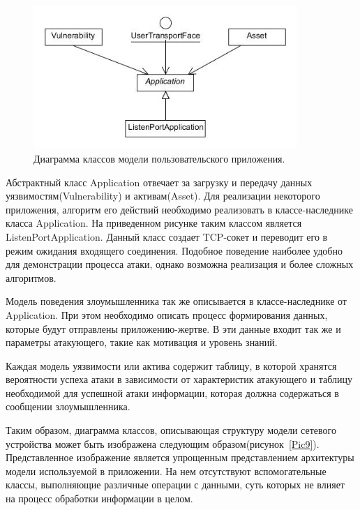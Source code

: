 \documentclass[12pt]{report}
\begin{document}
    \begin{figure}[h!]\center
        \includegraphics[width = 100mm]{Ch3Pic8}
        \caption{Диаграмма классов модели пользовательского приложения. } \label{Pic8}
    \end{figure}    

    Абстрактный класс Application отвечает за загрузку и передачу данных уязвимостям(Vulnerability) и активам(Asset). Для реализации некоторого приложения, алгоритм его действий необходимо реализовать в классе-наследнике класса Application. На приведенном рисунке таким классом является ListenPortApplication. Данный класс создает TCP-сокет и переводит его в режим ожидания входящего соединения. Подобное поведение наиболее удобно для демонстрации процесса атаки, однако возможна реализация и более сложных алгоритмов. 
    
    Модель поведения злоумышленника так же описывается в классе-наследнике от Application. При этом необходимо описать процесс формирования данных, которые будут отправлены приложению-жертве. В эти данные входит так же и параметры атакующего, такие как мотивация и уровень знаний. 
    
    Каждая модель уязвимости или актива содержит таблицу, в которой хранятся вероятности успеха атаки в зависимости от характеристик атакующего и таблицу необходимой для успешной атаки информации, которая должна содержаться в сообщении злоумышленника. 
    
    Таким образом, диаграмма классов, описывающая структуру модели сетевого устройства может быть изображена следующим образом(рисунок~\ref{Pic9}). Представленное изображение является упрощенным представлением архитектуры модели используемой в приложении. На нем отсутствуют вспомогательные классы, выполняющие различные операции с данными, суть которых не влияет на процесс обработки информации в целом.
\end{document}
